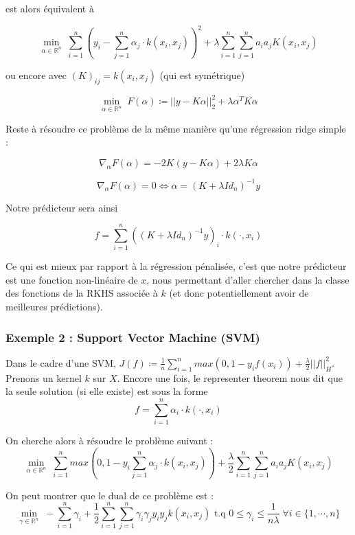 \documentclass[a4paper, 11pt, french]{article}
\theoremstyle{definition}
\begin{document}
	est alors équivalent à 
	
	\[\min_{\alpha \in \mathbb{R}^n} \; \sum_{i=1}^{n} (y_i - \sum_{j=1}^{n} \alpha_j \cdot k(x_i, x_j))^2 + \lambda \sum_{i=1}^{n} \sum_{j=1}^{n} a_i a_j K(x_i, x_j)\]
	
	ou encore avec $(K)_{ij} = k(x_i, x_j)$ (qui est symétrique)
	
	\[\min_{\alpha \in \mathbb{R}^n} \; F(\alpha) \coloneqq ||y - K \alpha||_2^2 + \lambda \alpha^T K \alpha\]
	
	Reste à résoudre ce problème de la même manière qu'une régression ridge simple :
	
	\[\nabla_{\alpha} F(\alpha) = -2 K (y - K \alpha) + 2\lambda K \alpha\]
	
	\[\nabla_{\alpha} F(\alpha) = 0 \Leftrightarrow \alpha = (K + \lambda Id_n)^{-1} y\]
	
	Notre prédicteur sera ainsi
	
	\[f = \sum_{i=1}^{n} ((K + \lambda Id_n)^{-1} y)_i \cdot k(\cdot, x_i)\]
	
	Ce qui est mieux par rapport à la régression pénalisée, c'est que notre prédicteur est une fonction non-linéaire de $x$, nous permettant d'aller chercher dans la classe des fonctions de la RKHS associée à $k$ (et donc potentiellement avoir de meilleures prédictions).
	
	\subsubsection{Exemple 2 : Support Vector Machine (SVM)}	
	
	Dans le cadre d'une SVM, $J(f) \coloneqq \frac{1}{n} \sum_{i=1}^{n} max(0, 1 - y_i f(x_i)) + \frac{\lambda}{2} ||f||_H^2$. Prenons un kernel $k$ sur $X$. Encore une fois, le representer theorem nous dit que la seule solution (si elle existe) est sous la forme
	\[f = \sum_{i=1}^{n} \alpha_i \cdot k(\cdot, x_i)\]
	
	On cherche alors à résoudre le problème suivant :
	\[\min_{\alpha \in \mathbb{R}^n} \; \sum_{i=1}^{n} max(0, 1 - y_i \sum_{j=1}^{n} \alpha_j \cdot k(x_i, x_j))  + \frac{\lambda}{2} \sum_{i=1}^{n} \sum_{j=1}^{n} a_i a_j K(x_i, x_j)\]
	
	 On peut montrer que le dual de ce problème est :
	\[\min_{\gamma \in \mathbb{R}^n} \; -\sum_{i=1}^{n} \gamma_i + \frac{1}{2} \sum_{i=1}^{n} \sum_{j=1}^{n} \gamma_i \gamma_j y_i y_j k(x_i, x_j) \text{ t.q } 0 \leq \gamma_i \leq \frac{1}{n \lambda} \; \forall i \in \{1, \cdots, n\}\]
	
\end{document}
